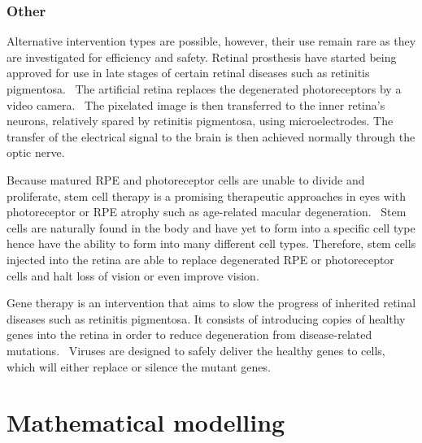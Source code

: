 \documentclass{article}
\begin{document}
\subsubsection*{Other}

Alternative intervention types are possible, however, their use remain rare as they are investigated for efficiency and safety.
Retinal prosthesis have started being approved for use in late stages of certain retinal diseases such as retinitis pigmentosa.~\cite{Luo_2016}
The artificial retina replaces the degenerated photoreceptors by a video camera.~\cite{Luo_2016,Stingl_2017}
The pixelated image is then transferred to the inner retina's neurons, relatively spared by retinitis pigmentosa, using microelectrodes.
The transfer of the electrical signal to the brain is then achieved normally through the optic nerve.~\cite{Luo_2016,Stingl_2017}

Because matured RPE and photoreceptor cells are unable to divide and proliferate, stem cell therapy is a promising therapeutic approaches in eyes with photoreceptor or RPE atrophy such as age-related macular degeneration.~\cite{Berta_2011,Stern_2015}
Stem cells are naturally found in the body and have yet to form into a specific cell type hence have the ability to form into many different cell types.
Therefore, stem cells injected into the retina are able to replace degenerated RPE or photoreceptor cells and halt loss of vision or even improve vision.~\cite{ONeill_2020}

Gene therapy is an intervention that aims to slow the progress of inherited retinal diseases such as retinitis pigmentosa.
It consists of introducing copies of healthy genes into the retina in order to reduce degeneration from disease-related mutations.~\cite{Battu_2022}
Viruses are designed to safely deliver the healthy genes to cells, which will either replace or silence the mutant genes.~\cite{Battu_2022} 









\section*{Mathematical modelling}
\end{document}
